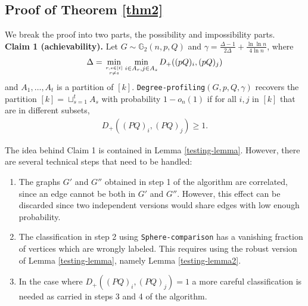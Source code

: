 \documentclass[11pt]{article}
\newcommand{\gs}{\mathbb{G}_2}
\newcommand{\dd}{D_+}
\newcommand{\1}{\mathbb{1}}
\begin{document}
\subsection{Proof of Theorem \ref{thm2}}\label{proof-thm-2}
We break the proof into two parts, the possibility and impossibility parts.  \\

\noindent
{\bf Claim 1 (achievability).} Let $G \sim \gs(n,p,Q)$ and $\gamma=  \frac{\Delta -1}{2 \Delta} +\frac{\ln\ln n}{4 \ln n}$, where $$\Delta = \min_{r,s \in [t] \atop{r \neq s}} \min_{ i \in A_r, j \in A_s}  \dd((pQ)_i, (pQ)_j)$$ and $A_1,\dots,A_t$ is a partition of $[k]$. {\tt Degree-profiling}$(G,p,Q,\gamma)$ recovers the partition $[k] = \sqcup_{s=1}^t A_s$ with probability $1-o_n(1)$ if for all $i,j$ in $[k]$ that are in different subsets,
\begin{align}
\dd ((PQ)_i , (PQ)_j) \geq 1. \label{d1b}
\end{align}

The idea behind Claim 1 is contained in Lemma \ref{testing-lemma}. However, there are several technical steps that need to be handled:
\begin{enumerate}
\item The graphs $G'$ and $G''$ obtained in step 1 of the algorithm are correlated, since an edge cannot be both in $G'$ and $G''$. However, this effect can be discarded since two independent versions would share edges with low enough probability. 
\item  The classification in step 2 using {\tt Sphere-comparison} has a vanishing fraction of vertices which are wrongly labeled. This requires using the robust version of Lemma \ref{testing-lemma}, namely Lemma \ref{testing-lemma2}. 
\item In the case where $\dd ((PQ)_i , (PQ)_j) = 1$ a more careful classification is needed as carried in steps 3 and 4 of the algorithm.    
\end{enumerate} 
\end{document}
